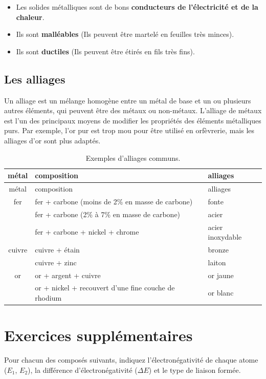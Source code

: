 \documentclass[
  11pt,
  french,
  a4paper,
  openany]{book}
\providecommand{\tightlist}{%
  \setlength{\itemsep}{0pt}\setlength{\parskip}{0pt}}
\begin{document}
\begin{itemize}
\tightlist
\item
  Les solides métalliques sont de bons \textbf{conducteurs de l'électricité et de la chaleur}.
\item
  Ils sont \textbf{malléables} (Ils peuvent être martelé en feuilles très minces).
\item
  Ils sont \textbf{ductiles} (Ils peuvent être étirés en fils très fins).
\end{itemize}

\hypertarget{les-alliages}{%
\subsection{Les alliages}\label{les-alliages}}

Un alliage est un mélange homogène entre un métal de base et un ou plusieurs autres éléments, qui peuvent être des métaux ou non-métaux. L'alliage de métaux est l'un des principaux moyens de modifier les propriétés des éléments métalliques purs. Par exemple, l'or pur est trop mou pour être utilisé en orfèvrerie, mais les alliages d'or sont plus adaptés.

\begin{longtable}[]{@{}cll@{}}
\caption{\label{tab:exemples-alliages-communs} Exemples d'alliages communs.}\tabularnewline
\toprule
métal & composition & alliages\tabularnewline
\midrule
\endfirsthead
\toprule
métal & composition & alliages\tabularnewline
\midrule
\endhead
fer & fer + carbone (moins de 2\% en masse de carbone) & fonte\tabularnewline
& fer + carbone (2\% à 7\% en masse de carbone) & acier\tabularnewline
& fer + carbone + nickel + chrome & acier inoxydable\tabularnewline
cuivre & cuivre + étain & bronze\tabularnewline
& cuivre + zinc & laiton\tabularnewline
or & or + argent + cuivre & or jaune\tabularnewline
& or + nickel + recouvert d'une fine couche de rhodium & or blanc\tabularnewline
\bottomrule
\end{longtable}

\hypertarget{exercices-suppluxe9mentaires-5}{%
\section{Exercices supplémentaires}\label{exercices-suppluxe9mentaires-5}}

\begin{Exercise}
Pour chacun des composés suivants, indiquez l'électronégativité de chaque atome (\(E_1\), \(E_2\)), la différence d'électronégativité (\(\Delta E\)) et le type de liaison formée.

\end{Exercise}
\end{document}
